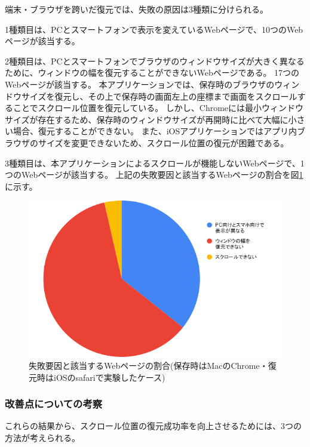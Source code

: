 端末・ブラウザを跨いだ復元では、失敗の原因は3種類に分けられる。

1種類目は、PCとスマートフォンで表示を変えているWebページで、10つのWebページが該当する。

2種類目は、PCとスマートフォンでブラウザのウィンドウサイズが大きく異なるために、ウィンドウの幅を復元することができないWebページである。
17つのWebページが該当する。
本アプリケーションでは、保存時のブラウザのウィンドウサイズを復元し、その上で保存時の画面左上の座標まで画面をスクロールすることでスクロール位置を復元している。
しかし、Chromeには最小ウィンドウサイズが存在するため、保存時のウィンドウサイズが再開時に比べて大幅に小さい場合、復元することができない。
また、iOSアプリケーションではアプリ内ブラウザのサイズを変更できないため、スクロール位置の復元が困難である。

3種類目は、本アプリケーションによるスクロールが機能しないWebページで、1つのWebページが該当する。
上記の失敗要因と該当するWebページの割合を図\ref{fig:evl-consideration-scroll-position-cause-ratio-multi-device}に示す。

\begin{figure}[htbp]
  \caption{失敗要因と該当するWebページの割合(保存時はMacのChrome・復元時はiOSのsafariで実験したケース)}
  \label{fig:evl-consideration-scroll-position-cause-ratio-multi-device}
  \begin{center}
    \includegraphics[bb=0 0 600 371,width=15cm]{img/060_evaluation/consideration/scroll_position/cause-ratio-multi-device.pdf}
  \end{center}
\end{figure}

\subsubsection{改善点についての考察}
これらの結果から、スクロール位置の復元成功率を向上させるためには、3つの方法が考えられる。

